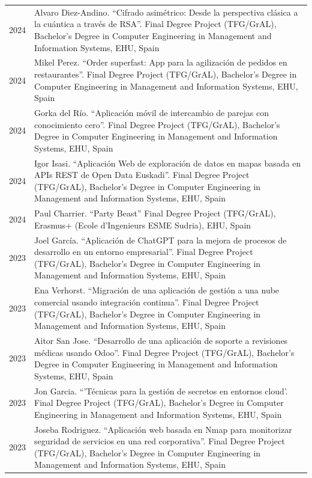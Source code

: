 \documentclass[11pt,fullpage]{article}
\begin{document}
\begin{longtable}{p{0.5in}|p{5.5in}}
2024 & Alvaro Diez-Andino. ``Cifrado asimétrico: Desde la perspectiva clásica a la cuántica a través de RSA''. Final Degree Project (TFG/GrAL), Bachelor's Degree in Computer Engineering in Management and Information Systems, EHU, Spain \\ 
2024 & Mikel Perez. ``Order superfast: App para la agilización de pedidos en restaurantes''. Final Degree Project (TFG/GrAL), Bachelor's Degree in Computer Engineering in Management and Information Systems, EHU, Spain \\   
2024 & Gorka del Río. ``Aplicación móvil de intercambio de parejas con conocimiento cero''. Final Degree Project (TFG/GrAL), Bachelor's Degree in Computer Engineering in Management and Information Systems, EHU, Spain \\ 
2024 & Igor Isasi. ``Aplicación Web de exploración de datos en mapas basada en APIs REST de Open Data Euskadi''. Final Degree Project (TFG/GrAL), Bachelor's Degree in Computer Engineering in Management and Information Systems, EHU, Spain\\  
2024 & Paul Charrier. ``Party Beast'' Final Degree Project (TFG/GrAL), Erasmus+ (Ecole d'Ingenieurs ESME Sudria), EHU, Spain \\
2023 & Joel García. ``Aplicación de ChatGPT para la mejora de procesos de desarrollo en un entorno empresarial''. Final Degree Project (TFG/GrAL), Bachelor's Degree in Computer Engineering in Management and Information Systems, EHU, Spain \\
2023 & Ena Verhorst. ``Migración de una aplicación de gestión a una nube comercial usando integración continua''. Final Degree Project (TFG/GrAL), Bachelor's Degree in Computer Engineering in Management and Information Systems, EHU, Spain \\
2023 & Aitor San Jose. ``Desarrollo de una aplicación de soporte a revisiones médicas usando Odoo''. Final Degree Project (TFG/GrAL), Bachelor's Degree in Computer Engineering in Management and Information Systems, EHU, Spain \\
2023 & Jon Garcia. ``'Técnicas para la gestión de secretos en entornos cloud'. Final Degree Project (TFG/GrAL), Bachelor's Degree in Computer Engineering in Management and Information Systems, EHU, Spain \\
2023 & Joseba Rodriguez. ``Aplicación web basada en Nmap para monitorizar seguridad de servicios en una red corporativa''. Final Degree Project (TFG/GrAL), Bachelor's Degree in Computer Engineering in Management and Information Systems, EHU, Spain \\

\end{longtable}
\end{document}
